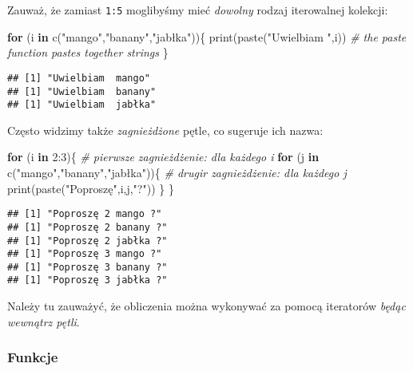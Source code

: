 \documentclass[
]{article}
\newenvironment{Shaded}{\begin{snugshade}}{\end{snugshade}}
\newcommand{\CommentTok}[1]{\textcolor[rgb]{0.56,0.35,0.01}{\textit{#1}}}
\newcommand{\ControlFlowTok}[1]{\textcolor[rgb]{0.13,0.29,0.53}{\textbf{#1}}}
\newcommand{\DecValTok}[1]{\textcolor[rgb]{0.00,0.00,0.81}{#1}}
\newcommand{\FunctionTok}[1]{\textcolor[rgb]{0.00,0.00,0.00}{#1}}
\newcommand{\NormalTok}[1]{#1}
\newcommand{\SpecialCharTok}[1]{\textcolor[rgb]{0.00,0.00,0.00}{#1}}
\newcommand{\StringTok}[1]{\textcolor[rgb]{0.31,0.60,0.02}{#1}}
\begin{document}
Zauważ, że zamiast \texttt{1:5} moglibyśmy mieć \emph{dowolny} rodzaj
iterowalnej kolekcji:

\begin{Shaded}
\begin{Highlighting}[]
\ControlFlowTok{for}\NormalTok{ (i }\ControlFlowTok{in} \FunctionTok{c}\NormalTok{(}\StringTok{"mango"}\NormalTok{,}\StringTok{"banany"}\NormalTok{,}\StringTok{"jabłka"}\NormalTok{))\{}
  \FunctionTok{print}\NormalTok{(}\FunctionTok{paste}\NormalTok{(}\StringTok{"Uwielbiam "}\NormalTok{,i))  }\CommentTok{\# the paste function pastes together strings}
\NormalTok{\}}
\end{Highlighting}
\end{Shaded}

\begin{verbatim}
## [1] "Uwielbiam  mango"
## [1] "Uwielbiam  banany"
## [1] "Uwielbiam  jabłka"
\end{verbatim}

Często widzimy także \emph{zagnieżdżone} pętle, co sugeruje ich nazwa:

\begin{Shaded}
\begin{Highlighting}[]
\ControlFlowTok{for}\NormalTok{ (i }\ControlFlowTok{in} \DecValTok{2}\SpecialCharTok{:}\DecValTok{3}\NormalTok{)\{}
  \CommentTok{\# pierwsze zagnieżdżenie: dla każdego i}
  \ControlFlowTok{for}\NormalTok{ (j }\ControlFlowTok{in} \FunctionTok{c}\NormalTok{(}\StringTok{"mango"}\NormalTok{,}\StringTok{"banany"}\NormalTok{,}\StringTok{"jabłka"}\NormalTok{))\{}
    \CommentTok{\# drugir zagnieżdżenie: dla każdego j}
    \FunctionTok{print}\NormalTok{(}\FunctionTok{paste}\NormalTok{(}\StringTok{"Poproszę"}\NormalTok{,i,j,}\StringTok{"?"}\NormalTok{))}
\NormalTok{  \}}
\NormalTok{\}}
\end{Highlighting}
\end{Shaded}

\begin{verbatim}
## [1] "Poproszę 2 mango ?"
## [1] "Poproszę 2 banany ?"
## [1] "Poproszę 2 jabłka ?"
## [1] "Poproszę 3 mango ?"
## [1] "Poproszę 3 banany ?"
## [1] "Poproszę 3 jabłka ?"
\end{verbatim}

Należy tu zauważyć, że obliczenia można wykonywać za pomocą iteratorów
\emph{będąc wewnątrz pętli}.

\hypertarget{funkcje}{%
\subsubsection{Funkcje}\label{funkcje}}
\end{document}
